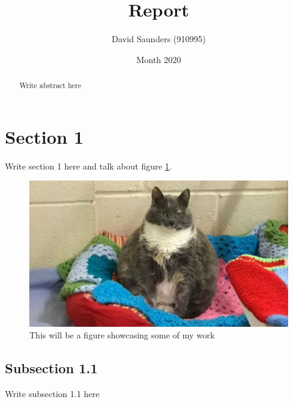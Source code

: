 \documentclass{article}
\title{Report}
\author{David Saunders (910995)}
\date{Month 2020}
\begin{document}
\maketitle

\begin{abstract} 
    Write abstract here
\end{abstract}

\tableofcontents

\section{Section 1}

Write section 1 here \cite{torsney2011tuner} and talk about figure \ref{fig:test}.

\begin{figure}[ht]
    \centering
    \includegraphics[scale=0.35]{Test.JPG}
    \caption{This will be a figure showcasing some of my work}
    \label{fig:test}
\end{figure}


\subsection{Subsection 1.1}
    Write subsection 1.1 here \cite{wikiChonker}

\printbibliography
\end{document}
